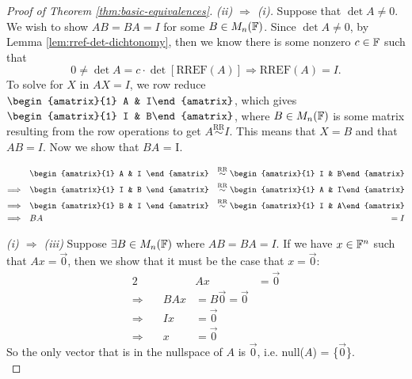 \begin{proof}[Proof of Theorem \ref{thm:basic-equivalences}]
\textit{(ii) $\Longrightarrow$ (i).} Suppose that $\det A \not= 0$. We wish to show $AB = BA = I$ for some $B \in M_n(\mathbb F)$. Since $\det A \not= 0$, by Lemma \ref{lem:rref-det-dichtonomy}, then we know there is some nonzero $c \in \mathbb F$ such that
$$
0 \not= \det A = c \cdot \det[\text{RREF}(A)] \Longrightarrow \text{RREF}(A) = I.
$$
To solve for $X$ in $AX = I$, we row reduce
$\begin{amatrix}{1} A & I\end{amatrix}$, which gives $\begin{amatrix}{1} I & B\end{amatrix}$, where $B \in M_n(\mathbb F)$ is some matrix resulting from the row operations to get $A \overset{\text{RR}}{\sim} I$. This means that $X = B$ and that $AB = I$. Now we show that $BA$ = I.

\begin{alignat*}{2}
& \begin{amatrix}{1} A & I \end{amatrix} &\overset{\text{RR}}{\sim} \begin{amatrix}{1} I & B\end{amatrix} \\
\Longrightarrow \quad & \begin{amatrix}{1} I & B \end{amatrix} &\overset{\text{RR}}{\sim} \begin{amatrix}{1} A & I\end{amatrix} \\
\Longrightarrow \quad & \begin{amatrix}{1} B & I \end{amatrix} &\overset{\text{RR}}{\sim} \begin{amatrix}{1} I & A\end{amatrix} \\
\Longrightarrow \quad & BA &= I
\end{alignat*}

\textit{(i) $\Longrightarrow$ (iii)} Suppose $\exists B \in M_n(\mathbb F)$ where $AB = BA = I$. If we have $x \in \mathbb F^n$ such that $Ax = \vec{0}$, then we show that it must be the case that $x = \vec{0}$:
\begin{alignat*}{2}
    && Ax &= \vec{0} \\
    \Longrightarrow \quad & BAx &= B\vec{0} = \vec{0} \\
    \Longrightarrow \quad & Ix &= \vec{0} \\
    \Longrightarrow \quad & x &= \vec{0}
\end{alignat*}
So the only vector that is in the nullspace of $A$ is $\vec{0}$, i.e. null($A$) = \{$\vec{0}$\}.\\


\end{proof}
